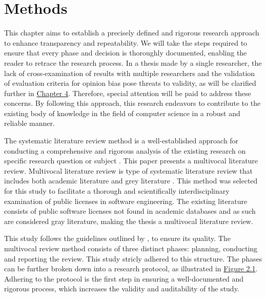 \chapter{Methods\label{methods}}
This chapter aims to establish a precisely defined and rigorous research approach to enhance transparency and repeatability. We will take the steps required to ensure that every phase and decision is thoroughly documented, enabling the reader to retrace the research process. In a thesis made by a single researcher, the lack of cross-examination of results with multiple researchers and the validation of evaluation criteria for opinion bias pose threats to validity, as will be clarified further in \hyperref[discussion]{Chapter 4}. Therefore, special attention will be paid to address these concerns. By following this approach, this research endeavors to contribute to the existing body of knowledge in the field of computer science in a robust and reliable manner.

The systematic literature review method is a well-established approach for conducting a comprehensive and rigorous analysis of the existing research on specific research question or subject \citep{kitchenham2007}. This paper presents a multivocal literature review. Multivocal literature review is type of systematic literature review that includes both academic literature and grey literature \citep{mantyla2019}. This method was selected for this study to facilitate a thorough and scientifically interdisciplinary examination of public licenses in software engineering. The existing literature consists of public software licenses not found in academic databases and as such are considered gray literature, making the thesis a multivocal literature review.

This study follows the guidelines outlined by \cite{kitchenham2007}, to ensure its quality. The multivocal review method consists of three distinct phases: planning, conducting and reporting the review. This study stricly adhered to this structure. The phases can be further broken down into a research protocol, as illustrated in \hyperref[fig:slrphases]{Figure 2.1}. Adhering to the protocol is the first step in ensuring a well-documented and rigorous process, which increases the validity and auditability of the study.

